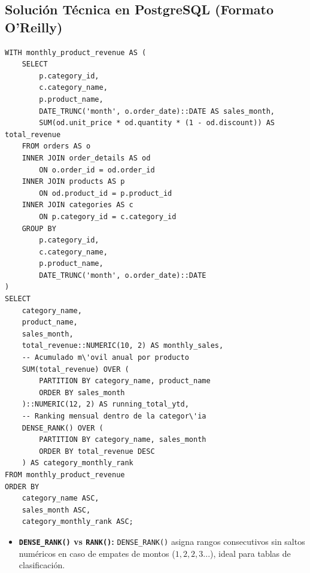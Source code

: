 \subsection{Soluci\'on T\'ecnica en PostgreSQL (Formato O'Reilly)}

\begin{lstlisting}[style=sqlstyle, caption={Consulta anal\'itica con Window Functions y acumulados}]
WITH monthly_product_revenue AS (
    SELECT
        p.category_id,
        c.category_name,
        p.product_name,
        DATE_TRUNC('month', o.order_date)::DATE AS sales_month,
        SUM(od.unit_price * od.quantity * (1 - od.discount)) AS total_revenue
    FROM orders AS o
    INNER JOIN order_details AS od
        ON o.order_id = od.order_id
    INNER JOIN products AS p
        ON od.product_id = p.product_id
    INNER JOIN categories AS c
        ON p.category_id = c.category_id
    GROUP BY
        p.category_id,
        c.category_name,
        p.product_name,
        DATE_TRUNC('month', o.order_date)::DATE
)
SELECT
    category_name,
    product_name,
    sales_month,
    total_revenue::NUMERIC(10, 2) AS monthly_sales,
    -- Acumulado m\'ovil anual por producto
    SUM(total_revenue) OVER (
        PARTITION BY category_name, product_name
        ORDER BY sales_month
    )::NUMERIC(12, 2) AS running_total_ytd,
    -- Ranking mensual dentro de la categor\'ia
    DENSE_RANK() OVER (
        PARTITION BY category_name, sales_month
        ORDER BY total_revenue DESC
    ) AS category_monthly_rank
FROM monthly_product_revenue
ORDER BY
    category_name ASC,
    sales_month ASC,
    category_monthly_rank ASC;
\end{lstlisting}

\begin{engtip}
\begin{itemize}
    \item \textbf{\texttt{DENSE\_RANK()} vs \texttt{RANK()}:} \texttt{DENSE\_RANK()} asigna rangos consecutivos sin saltos num\'ericos en caso de empates de montos ($1, 2, 2, 3...$), ideal para tablas de clasificaci\'on.
\end{itemize}
\end{engtip}
